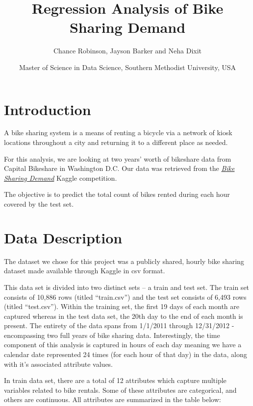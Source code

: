 \documentclass[american,]{article}
\title{Regression Analysis of Bike Sharing Demand}
\author{Chance Robinson, Jayson Barker and Neha Dixit}
\date{Master of Science in Data Science, Southern Methodist University, USA}
\begin{document}
\maketitle

\hypertarget{introduction}{%
\section{Introduction}\label{introduction}}

A bike sharing system is a means of renting a bicycle via a network of kiosk locations throughout a city and returning it to a different place as needed.

For this analysis, we are looking at two years' worth of bikeshare data from Capital Bikeshare in Washington D.C. Our data was retrieved from the \href{https://www.kaggle.com/c/bike-sharing-demand/overview}{\textit{
Bike Sharing Demand}} \cite{Kaggle2014} Kaggle competition.

The objective is to predict the total count of bikes rented during each hour covered by the test set.

\hypertarget{data-description}{%
\section{Data Description}\label{data-description}}

The dataset we chose for this project was a publicly shared, hourly bike sharing dataset made available through Kaggle in csv format.

This data set is divided into two distinct sets -- a train and test set. The train set consists of 10,886 rows (titled ``train.csv'') and the test set consists of 6,493 rows (titled ``test.csv''). Within the training set, the first 19 days of each month are captured whereas in the test data set, the 20th day to the end of each month is present. The entirety of the data spans from 1/1/2011 through 12/31/2012 - encompassing two full years of bike sharing data. Interestingly, the time component of this analysis is captured in hours of each day meaning we have a calendar date represented 24 times (for each hour of that day) in the data, along with it's associated attribute values.

\newpage

In train data set, there are a total of 12 attributes which capture multiple variables related to bike rentals. Some of these attributes are categorical, and others are continuous. All attributes are summarized in the table below:
\end{document}
